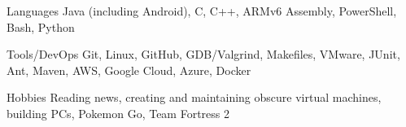 

\begin{cvskills}


  \cvskill
    {Languages} %
    {Java (including Android), C, C++, ARMv6 Assembly, PowerShell, Bash, Python} %
    
  \cvskill
    {Tools/DevOps} %
    {Git, Linux, GitHub, GDB/Valgrind, Makefiles, VMware, JUnit, Ant, Maven, AWS, Google Cloud, Azure, Docker} %

  \cvskill
  {Hobbies} %
  {Reading news, creating and maintaining obscure virtual machines, building PCs, Pokemon Go, Team Fortress 2} %

\end{cvskills}
